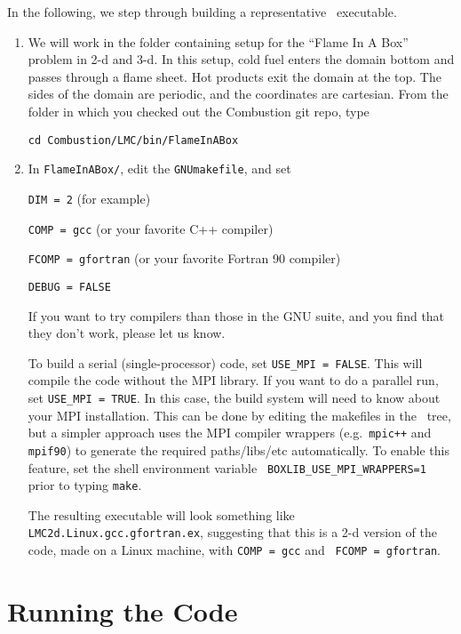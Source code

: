 In the following, we step through building a representative \lmc\ executable.
\begin{enumerate}
\item We will work in the folder containing setup for the ``Flame In A Box'' problem in 2-d and 3-d.
In this setup, cold fuel enters the domain bottom and passes through a flame sheet.
Hot products exit the domain at the top.  The sides of the domain are periodic, and the coordinates are
cartesian. From the folder in which you checked out the {\sf Combustion} git repo,
  type
\begin{verbatim}
cd Combustion/LMC/bin/FlameInABox
\end{verbatim}

\item In {\tt FlameInABox/}, edit the {\tt GNUmakefile}, and set

{\tt DIM = 2} (for example)

{\tt COMP = gcc} (or your favorite C++ compiler)

{\tt FCOMP = gfortran} (or your favorite Fortran 90 compiler)

{\tt DEBUG = FALSE}

If you want to try compilers than those in the GNU suite, and you find that they don't
work, please let us know.

To build a serial (single-processor) code, set {\tt USE\_MPI = FALSE}.
This will compile the code without the MPI library.  If you want to do
a parallel run, set {\tt USE\_MPI = TRUE}.  In this
case, the build system will need to know about your MPI installation.
This can be done by editing the makefiles in the \boxlib\ tree, but a
simpler approach uses the MPI compiler wrappers
(e.g.\ {\tt mpic++} and {\tt mpif90}) to generate the 
required paths\slash libs\slash etc automatically.  To enable this
feature, set the shell environment variable {\tt
  BOXLIB\_USE\_MPI\_WRAPPERS=1} prior to typing {\tt make}.

  The resulting executable will look something like {\tt
    LMC2d.Linux.gcc.gfortran.ex}, suggesting that this is a 2-d version
  of the code, made on a Linux machine, with {\tt COMP = gcc} and {\tt
    FCOMP = gfortran}.

\end{enumerate}

\section{Running the Code}

